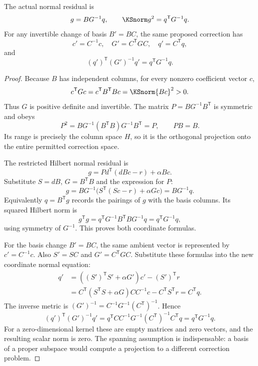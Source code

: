 \begin{KSproposition}\label{KS:WR15}
The actual normal residual is
\begin{equation}\label{KS:eq:covector-norm}
 g=BG^{-1}q,\qquad \KSnorm g^2=q^{\mathsf T}G^{-1}q.
\end{equation}
For any invertible change of basis $B'=BC$, the same proposed correction has
\[
 c'=C^{-1}c,\quad G'=C^{\mathsf T}GC,\quad q'=C^{\mathsf T}q,
\]
and
\[
 (q')^{\mathsf T}(G')^{-1}q'=q^{\mathsf T}G^{-1}q.
\]
\end{KSproposition}
\begin{proof}
Because $B$ has independent columns, for every nonzero coefficient vector $c$,
\[
 c^{\mathsf T}Gc=c^{\mathsf T}B^{\mathsf T}Bc=\KSnorm{Bc}^2>0.
\]
Thus $G$ is positive definite and invertible. The matrix $P=BG^{-1}B^{\mathsf T}$ is symmetric and obeys
\[
 P^2=BG^{-1}(B^{\mathsf T}B)G^{-1}B^{\mathsf T}=P,
 \qquad PB=B.
\]
Its range is precisely the column space $H$, so it is the orthogonal projection onto the entire permitted correction space.

The restricted Hilbert normal residual is
\[
 g=P d^{\mathsf T}(dBc-r)+\alpha Bc.
\]
Substitute $S=dB$, $G=B^{\mathsf T}B$ and the expression for $P$:
\[
 g=BG^{-1}\bigl(S^{\mathsf T}(Sc-r)+\alpha Gc\bigr)=BG^{-1}q.
\]
Equivalently $q=B^{\mathsf T}g$ records the pairings of $g$ with the basis columns. Its squared Hilbert norm is
\[
 g^{\mathsf T}g
 =q^{\mathsf T}G^{-1}B^{\mathsf T}BG^{-1}q
 =q^{\mathsf T}G^{-1}q,
\]
using symmetry of $G^{-1}$. This proves both coordinate formulas.

For the basis change $B'=BC$, the same ambient vector is represented by $c'=C^{-1}c$. Also $S'=SC$ and $G'=C^{\mathsf T}GC$. Substitute these formulas into the new coordinate normal equation:
\[
\begin{aligned}
 q'&=((S')^{\mathsf T}S'+\alpha G')c'-(S')^{\mathsf T}r\\
 &=C^{\mathsf T}(S^{\mathsf T}S+\alpha G)CC^{-1}c
      -C^{\mathsf T}S^{\mathsf T}r=C^{\mathsf T}q.
\end{aligned}
\]
The inverse metric is $(G')^{-1}=C^{-1}G^{-1}(C^{\mathsf T})^{-1}$. Hence
\[
 (q')^{\mathsf T}(G')^{-1}q'
 =q^{\mathsf T}C C^{-1}G^{-1}(C^{\mathsf T})^{-1}C^{\mathsf T}q
 =q^{\mathsf T}G^{-1}q.
\]
For a zero-dimensional kernel these are empty matrices and zero vectors, and the resulting scalar norm is zero. The spanning assumption is indispensable: a basis of a proper subspace would compute a projection to a different correction problem.
\end{proof}

